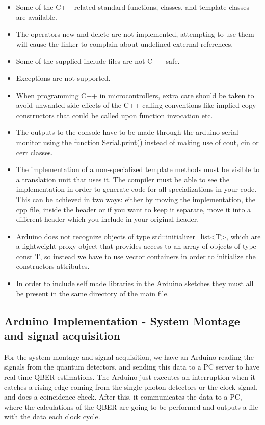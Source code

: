 \begin{refsection}
	\begin{itemize}
		\item Some of the C++ related standard functions, classes, and template classes are available.
		\item The operators new and delete are not implemented, attempting to use them will cause the linker to complain about undefined external references.
		\item Some of the supplied include files are not C++ safe.
		\item Exceptions are not supported.
		\item When programming C++ in microcontrollers, extra care should be taken to avoid unwanted side effects of the C++ calling conventions like implied copy constructors that could be called upon function invocation etc.
		\item The outputs to the console have to be made through the arduino serial monitor using the function Serial.print() instead of making use of cout, cin or cerr classes.
		\item  The implementation of a non-specialized template methods must be visible to a translation unit that uses it. The compiler must be able to see the implementation in order to generate code for all specializations in your code. This can be achieved in two ways: either by moving the implementation, the cpp file, inside the header or if you want to keep it separate, move it into a different header which you include in your original header.
		\item Arduino does not recognize objects of type std::initializer\_list<T>, which are a lightweight proxy object that provides access to an array of objects of type const T, so instead we have to use vector containers in order to initialize the constructors attributes.
		\item In order to include self made libraries in the Arduino sketches they must all be present in the same directory of the main file.
		
	\end{itemize}
	
	\clearpage
	
	\subsection{Arduino Implementation - System Montage and signal acquisition}
	
	For the system montage and signal acquisition, we have an Arduino reading the signals from the quantum detectors, and sending this data to a PC server to have real time QBER estimations. The Arduino just executes an interruption when it catches a rising edge coming from the single photon detectors or the clock signal, and does a coincidence check. After this, it communicates the data to a PC, where the calculations of the QBER are going to be performed and outputs a file with the data each clock cycle. 
	

\end{refsection}
